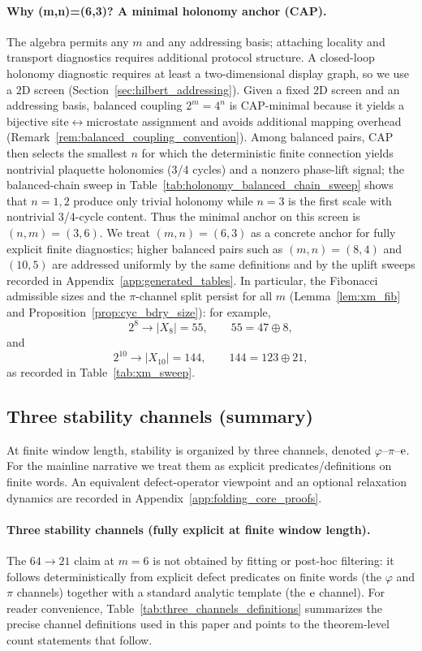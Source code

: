 \paragraph{Why (m,n)=(6,3)? A minimal holonomy anchor (CAP).}
The algebra permits any $m$ and any addressing basis; attaching locality and transport diagnostics requires additional protocol structure.
A closed-loop holonomy diagnostic requires at least a two-dimensional display graph, so we use a $2$D screen (Section~\ref{sec:hilbert_addressing}).
Given a fixed $2$D screen and an addressing basis, balanced coupling $2^m=4^n$ is CAP-minimal because it yields a bijective site$\leftrightarrow$microstate assignment and avoids additional mapping overhead (Remark~\ref{rem:balanced_coupling_convention}).
Among balanced pairs, CAP then selects the smallest $n$ for which the deterministic finite connection yields nontrivial plaquette holonomies (3/4 cycles) and a nonzero phase-lift signal; the balanced-chain sweep in Table~\ref{tab:holonomy_balanced_chain_sweep} shows that $n=1,2$ produce only trivial holonomy while $n=3$ is the first scale with nontrivial 3/4-cycle content.
Thus the minimal anchor on this screen is $(n,m)=(3,6)$.
We treat $(m,n)=(6,3)$ as a concrete anchor for fully explicit finite diagnostics; higher balanced pairs such as $(m,n)=(8,4)$ and $(10,5)$ are addressed uniformly by the same definitions and by the uplift sweeps recorded in Appendix~\ref{app:generated_tables}.
In particular, the Fibonacci admissible sizes and the $\pi$-channel split persist for all $m$ (Lemma~\ref{lem:xm_fib} and Proposition~\ref{prop:cyc_bdry_size}): for example,
\[
2^8\to |X_8|=55,\qquad 55=47\oplus 8,
\]
and
\[
2^{10}\to |X_{10}|=144,\qquad 144=123\oplus 21,
\]
as recorded in Table~\ref{tab:xm_sweep}.

\subsection{Three stability channels (summary)}
\label{subsec:defect_operators}

At finite window length, stability is organized by three channels, denoted $\varphi$--$\pi$--$\mathrm{e}$.
For the mainline narrative we treat them as explicit predicates/definitions on finite words.
An equivalent defect-operator viewpoint and an optional relaxation dynamics are recorded in Appendix~\ref{app:folding_core_proofs}.

\paragraph{Three stability channels (fully explicit at finite window length).}
The $64\to 21$ claim at $m=6$ is not obtained by fitting or post-hoc filtering: it follows deterministically from explicit defect predicates on finite words (the $\varphi$ and $\pi$ channels) together with a standard analytic template (the $\mathrm{e}$ channel).
For reader convenience, Table~\ref{tab:three_channels_definitions} summarizes the precise channel definitions used in this paper and points to the theorem-level count statements that follow.

